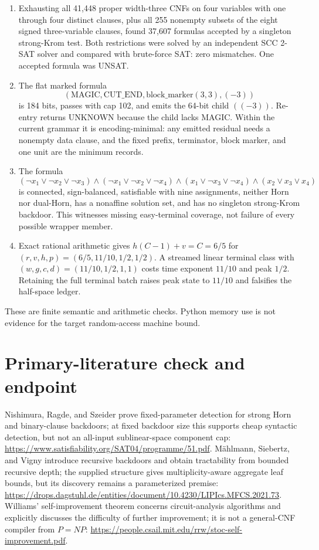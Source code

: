 \documentclass[11pt]{article}
\begin{document}
\begin{enumerate}
  \item Exhausting all 41,448 proper width-three CNFs on four variables with
  one through four distinct clauses, plus all 255 nonempty subsets of the
  eight signed three-variable clauses, found 37,607 formulas accepted by a
  singleton strong-Krom test.  Both restrictions were solved by an
  independent SCC 2-SAT solver and compared with brute-force SAT: zero
  mismatches.  One accepted formula was UNSAT.
  \item The flat marked formula
  \[
   (\mathrm{MAGIC},\mathrm{CUT\_END},
     \mathrm{block\_marker}(3,3),(-3))
  \]
  is 184 bits, passes with cap 102, and emits the 64-bit child $((-3))$.
  Re-entry returns UNKNOWN because the child lacks MAGIC.  Within the current
  grammar it is encoding-minimal: any emitted residual needs a nonempty data
  clause, and the fixed prefix, terminator, block marker, and one unit are the
  minimum records.
  \item The formula
  \[
   (\neg x_1\vee\neg x_2\vee\neg x_3)\wedge
   (\neg x_1\vee\neg x_2\vee\neg x_4)\wedge
   (x_1\vee\neg x_3\vee\neg x_4)\wedge
   (x_2\vee x_3\vee x_4)
  \]
  is connected, sign-balanced, satisfiable with nine assignments, neither
  Horn nor dual-Horn, has a nonaffine solution set, and has no singleton
  strong-Krom backdoor.  This witnesses missing easy-terminal coverage, not
  failure of every possible wrapper member.
  \item Exact rational arithmetic gives
  $h(C-1)+v=C=6/5$ for
  $(r,v,h,p)=(6/5,11/10,1/2,1/2)$.  A streamed linear terminal class with
  $(w,g,c,d)=(11/10,1/2,1,1)$ costs time exponent $11/10$ and peak $1/2$.
  Retaining the full terminal batch raises peak state to $11/10$ and
  falsifies the half-space ledger.
\end{enumerate}

These are finite semantic and arithmetic checks.  Python memory use is not
evidence for the target random-access machine bound.

\section{Primary-literature check and endpoint}

Nishimura, Ragde, and Szeider prove fixed-parameter detection for strong
Horn and binary-clause backdoors; at fixed backdoor size this supports cheap
syntactic detection, but not an all-input sublinear-space component cap:
\url{https://www.satisfiability.org/SAT04/programme/51.pdf}.
M\"ahlmann, Siebertz, and Vigny introduce recursive backdoors and obtain
tractability from bounded recursive depth; the supplied structure gives
multiplicity-aware aggregate leaf bounds, but its discovery remains a
parameterized premise:
\url{https://drops.dagstuhl.de/entities/document/10.4230/LIPIcs.MFCS.2021.73}.
Williams' self-improvement theorem concerns circuit-analysis algorithms and
explicitly discusses the difficulty of further improvement; it is not a
general-CNF compiler from $P=NP$:
\url{https://people.csail.mit.edu/rrw/stoc-self-improvement.pdf}.
\end{document}
